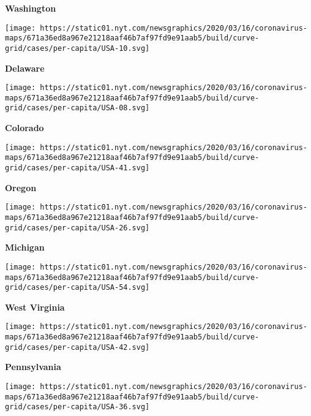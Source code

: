 \textbf{Washington}

\href{https://www.nytimes.com/interactive/2020/us/delaware-coronavirus-cases.html}{}

\texttt{[image: https://static01.nyt.com/newsgraphics/2020/03/16/coronavirus-maps/671a36ed8a967e21218aaf46b7af97fd9e91aab5/build/curve-grid/cases/per-capita/USA-10.svg]}

\textbf{Delaware}

\href{https://www.nytimes.com/interactive/2020/us/colorado-coronavirus-cases.html}{}

\texttt{[image: https://static01.nyt.com/newsgraphics/2020/03/16/coronavirus-maps/671a36ed8a967e21218aaf46b7af97fd9e91aab5/build/curve-grid/cases/per-capita/USA-08.svg]}

\textbf{Colorado}

\href{https://www.nytimes.com/interactive/2020/us/oregon-coronavirus-cases.html}{}

\texttt{[image: https://static01.nyt.com/newsgraphics/2020/03/16/coronavirus-maps/671a36ed8a967e21218aaf46b7af97fd9e91aab5/build/curve-grid/cases/per-capita/USA-41.svg]}

\textbf{Oregon}

\href{https://www.nytimes.com/interactive/2020/us/michigan-coronavirus-cases.html}{}

\texttt{[image: https://static01.nyt.com/newsgraphics/2020/03/16/coronavirus-maps/671a36ed8a967e21218aaf46b7af97fd9e91aab5/build/curve-grid/cases/per-capita/USA-26.svg]}

\textbf{Michigan}

\href{https://www.nytimes.com/interactive/2020/us/west-virginia-coronavirus-cases.html}{}

\texttt{[image: https://static01.nyt.com/newsgraphics/2020/03/16/coronavirus-maps/671a36ed8a967e21218aaf46b7af97fd9e91aab5/build/curve-grid/cases/per-capita/USA-54.svg]}

\textbf{West Virginia}

\href{https://www.nytimes.com/interactive/2020/us/pennsylvania-coronavirus-cases.html}{}

\texttt{[image: https://static01.nyt.com/newsgraphics/2020/03/16/coronavirus-maps/671a36ed8a967e21218aaf46b7af97fd9e91aab5/build/curve-grid/cases/per-capita/USA-42.svg]}

\textbf{Pennsylvania}

\href{https://www.nytimes.com/interactive/2020/us/new-york-coronavirus-cases.html}{}

\texttt{[image: https://static01.nyt.com/newsgraphics/2020/03/16/coronavirus-maps/671a36ed8a967e21218aaf46b7af97fd9e91aab5/build/curve-grid/cases/per-capita/USA-36.svg]}

